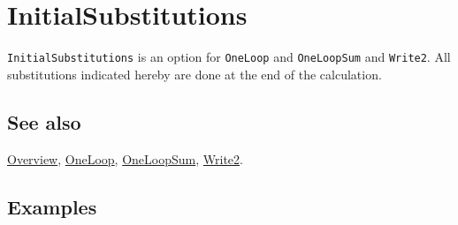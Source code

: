 \documentclass[../FeynCalcManual.tex]{subfiles}
\begin{document}
\hypertarget{initialsubstitutions}{%
\section{InitialSubstitutions}\label{initialsubstitutions}}

\texttt{InitialSubstitutions} is an option for \texttt{OneLoop} and
\texttt{OneLoopSum} and \texttt{Write2}. All substitutions indicated
hereby are done at the end of the calculation.

\subsection{See also}

\hyperlink{toc}{Overview}, \hyperlink{oneloop}{OneLoop},
\hyperlink{oneloopsum}{OneLoopSum}, \hyperlink{write2}{Write2}.

\subsection{Examples}
\end{document}
